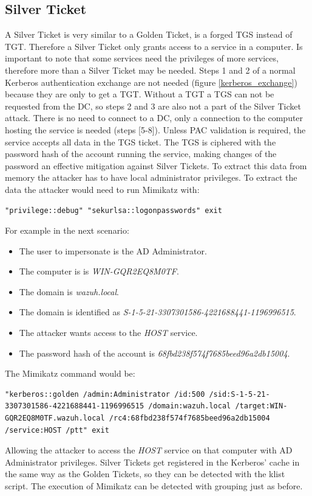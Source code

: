 \subsection{Silver Ticket}
A Silver Ticket is very similar to a Golden Ticket, is a forged TGS instead of TGT. Therefore a Silver Ticket only grants access to a service in a computer. Is important to note that some services need the privileges of more services, therefore more than a Silver Ticket may be needed.
\linej
Steps 1 and 2 of a normal Kerberos authentication exchange are not needed (figure \ref{kerberos_exchange}) because they are only to get a TGT. Without a TGT a TGS can not be requested from the DC, so steps 2 and 3 are also not a part of the Silver Ticket attack.
\linej
There is no need to connect to a DC, only a connection to the computer hosting the service is needed (steps [5-8]). Unless PAC validation is required, the service accepts all data in the TGS ticket.
\linej
The TGS is ciphered with the password hash of the account running the service, making changes of the password an effective mitigation against Silver Tickets.
To extract this data from memory the attacker has to have local administrator privileges\cite{events_1}\cite{silver_ticket}.
\linej
\linej
To extract the data the attacker would need to run Mimikatz with:
\begin{lstlisting}[style=PS,numbers=none]
"privilege::debug" "sekurlsa::logonpasswords" exit
\end{lstlisting}
\linej
For example in the next scenario:
\begin{itemize}
	\item The user to impersonate is the AD Administrator.
	\item The computer is is \textit{WIN-GQR2EQ8M0TF}.
	\item The domain is \textit{wazuh.local}.
	\item The domain is identified as \textit{S-1-5-21-3307301586-4221688441-1196996515}.
	\item The attacker wants access to the \textit{HOST} service.
	\item The password hash of the account is \textit{68fbd238f574f7685beed96a2db15004}.
\end{itemize}
The Mimikatz command would be:
\begin{lstlisting}[style=PS,numbers=none]
"kerberos::golden /admin:Administrator /id:500 /sid:S-1-5-21-3307301586-4221688441-1196996515 /domain:wazuh.local /target:WIN-GQR2EQ8M0TF.wazuh.local /rc4:68fbd238f574f7685beed96a2db15004 /service:HOST /ptt" exit
\end{lstlisting}
Allowing the attacker to access the \textit{HOST} service on that computer with AD Administrator privileges.
\linej
\linej
Silver Tickets get registered in the Kerberos' cache in the same way as the Golden Tickets, so they can be detected with the klist script. The execution of Mimikatz can be detected with grouping just as before.

